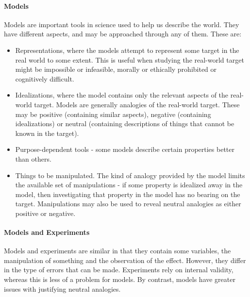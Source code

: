 \paragraph{Models}
Models are important tools in science used to help us describe the world. They have different aspects, and may be approached through any of them. These are:
\begin{itemize}
	\item Representations, where the models attempt to represent some target in the real world to some extent. This is useful when studying the real-world target might be impossible or infeasible, morally or ethically prohibited or cognitively difficult.
	\item Idealizations, where the model contains only the relevant aspects of the real-world target. Models are generally analogies of the real-world target. These may be positive (containing similar aspects), negative (containing idealizations) or neutral (containing descriptions of things that cannot be known in the target).
	\item Purpose-dependent tools - some models describe certain properties better than others.
	\item Things to be manipulated. The kind of analogy provided by the model limits the available set of manipulations - if some property is idealized away in the model, then investigating that property in the model has no bearing on the target. Manipulations may also be used to reveal neutral analogies as either positive or negative.
\end{itemize}

\paragraph{Models and Experiments}
Models and experiments are similar in that they contain some variables, the manipulation of something and the observation of the effect. However, they differ in the type of errors that can be made. Experiments rely on internal validity, whereas this is less of a problem for models. By contrast, models have greater issues with justifying neutral analogies.

